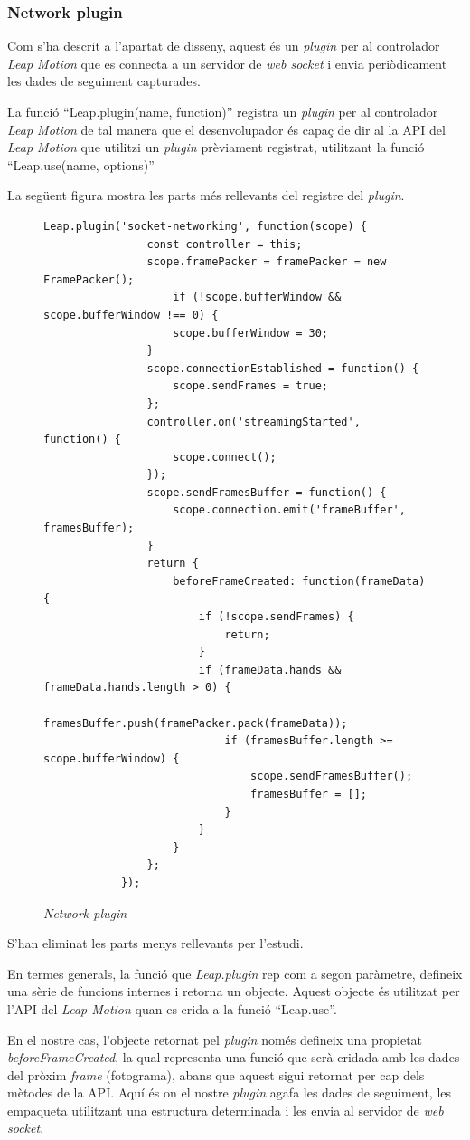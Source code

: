 \documentclass[12pt,a4paper,catalan]{article}
\begin{document}
	\subsubsection{Network plugin}
	Com s'ha descrit a l'apartat de disseny, aquest és un \textit{plugin} per al controlador \textit{Leap Motion} que es connecta a un servidor de \textit{web socket} i envia periòdicament les dades de seguiment capturades.
	
	La funció “Leap.plugin(name, function)” registra un \textit{plugin} per al controlador \textit{Leap Motion} de tal manera que el desenvolupador és capaç de dir al la API del \textit{Leap Motion} que utilitzi un \textit{plugin} prèviament registrat, utilitzant la funció “Leap.use(name, options)”
	
	La següent figura mostra les parts més rellevants del registre del \textit{plugin}.
	\begin{figure}[H]
		\begin{lstlisting}[gobble=12, tabsize=4]
			Leap.plugin('socket-networking', function(scope) {
				const controller = this;
				scope.framePacker = framePacker = new FramePacker();
					if (!scope.bufferWindow && scope.bufferWindow !== 0) {
					scope.bufferWindow = 30;
				}
				scope.connectionEstablished = function() {
					scope.sendFrames = true;
				};
				controller.on('streamingStarted', function() {
					scope.connect();
				});
				scope.sendFramesBuffer = function() {
					scope.connection.emit('frameBuffer', framesBuffer);
				}
				return {
					beforeFrameCreated: function(frameData) {
						if (!scope.sendFrames) {
							return;
						}
						if (frameData.hands && frameData.hands.length > 0) {
							framesBuffer.push(framePacker.pack(frameData));
							if (framesBuffer.length >= scope.bufferWindow) {
								scope.sendFramesBuffer();
								framesBuffer = [];
							}
						}
					}
				};
			});
		\end{lstlisting}
		\caption{\textit{Network plugin}}
		\label{fig:network-plugin}
	\end{figure}
	S'han eliminat les parts menys rellevants per l'estudi.
	
	En termes generals, la funció que \textit{Leap.plugin} rep com a segon paràmetre, defineix una sèrie de funcions internes i retorna un objecte. Aquest objecte és utilitzat per l'API del \textit{Leap Motion} quan es crida a la funció “Leap.use”.
	
	En el nostre cas, l'objecte retornat pel \textit{plugin} només defineix una propietat \textit{beforeFrameCreated}, la qual representa una funció que serà cridada amb les dades del pròxim \textit{frame} (fotograma), abans que aquest sigui retornat per cap dels mètodes de la API.
	Aquí és on el nostre \textit{plugin} agafa les dades de seguiment, les empaqueta utilitzant una estructura determinada i les envia al servidor de \textit{web socket}.
	
\end{document}
